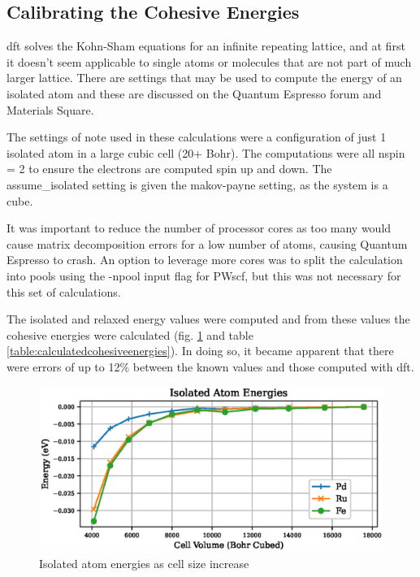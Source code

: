 \subsection{Calibrating the Cohesive Energies}

\acrlong{dft} solves the Kohn-Sham equations for an infinite repeating lattice, and at first it doesn't seem applicable to single atoms or molecules that are not part of much larger lattice.  There are settings that may be used to compute the energy of an isolated atom and these are discussed on the Quantum Espresso forum\cite{qeforum} and Materials Square\cite{materialssquaresingleatom}. 

The settings of note used in these calculations were a configuration of just 1 isolated atom in a large cubic cell (20+ Bohr).  The computations were all nspin = 2 to ensure the electrons are computed spin up and down.  The assume\_isolated setting is given the makov-payne setting, as the system is a cube.

It was important to reduce the number of processor cores as too many would cause matrix decomposition errors for a low number of atoms, causing Quantum Espresso to crash.  An option to leverage more cores was to split the calculation into pools using the -npool input flag for PWscf, but this was not necessary for this set of calculations.


The isolated and relaxed energy values were computed and from these values the cohesive energies were calculated (fig. \ref{fig:isolatedatoms} and table \ref{table:calculatedcohesiveenergies}).  In doing so, it became apparent that there were errors of up to 12\% between the known values and those computed with \acrshort{dft}.

\begin{figure}[h]
\begin{center}
\includegraphics[width=0.8\linewidth]{chapters/potentials_fe_pd_ru/isolated/isolated_63.eps}
\caption{Isolated atom energies as cell size increase}
\label{fig:isolatedatoms}
\end{center}
\end{figure}

